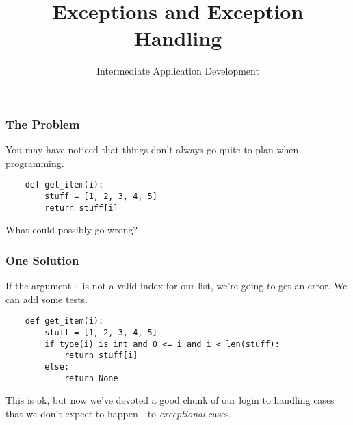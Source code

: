 \documentclass[10pt]{beamer}
\title{Exceptions and Exception Handling}
\author[IN608]{Intermediate Application Development}
\institute[Otago Polytechnic]{
  Otago Polytechnic \\
  Dunedin, New Zealand \\
  Kaiako: Tom Clark
}
\date{}
\begin{document}
\begin{frame}[plain]
  \titlepage
\end{frame}

\begin{frame}[fragile]
  \frametitle{The Problem}
  
  You may have noticed that things don't always go quite to plan when
  programming.
  
  \vspace{5mm}
  \begin{verbatim}
    def get_item(i):
        stuff = [1, 2, 3, 4, 5]
        return stuff[i]
  \end{verbatim}
  
  \vspace{5mm}
  What could possibly go wrong?
        
\end{frame}

\begin{frame}[fragile]
  \frametitle{One Solution}
  
  If the argument \texttt{i} is not a valid index for our list, we're
  going to get an error. We can add some tests.
    
  \vspace{5mm}
  \begin{verbatim}
    def get_item(i):
        stuff = [1, 2, 3, 4, 5]
        if type(i) is int and 0 <= i and i < len(stuff):
            return stuff[i]
        else:
            return None    
  \end{verbatim}
  
  \vspace{5mm}
  This is ok, but now we've devoted a good chunk of our login to handling 
  cases that we don't expect to happen - to \emph{exceptional} cases.
\end{frame}
\end{document}
